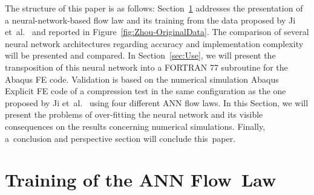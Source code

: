 \documentclass[algorithms,article,accept,pdftex,moreauthors]{Definitions/mdpi}
\begin{document}
The structure of this paper is as follows:
Section~\ref{sec:Training} addresses the presentation of a neural-network-based flow law and its training from the data proposed by Ji et~al.~\cite{Ji-2018} and reported in Figure~\ref{fig:Zhou-OriginalData}.
The comparison of several neural network architectures regarding accuracy and implementation complexity will be presented and compared.
In Section~\ref{sec:Use}, we will present the transposition of this neural network into a FORTRAN 77 subroutine for the Abaqus FE code.
Validation is based on the numerical simulation Abaqus Explicit FE code of a compression test in the same configuration as the one proposed by Ji et~al.~\cite{Ji-2018} using four different ANN flow laws.
In this Section, we will present the problems of over-fitting the neural network and its visible consequences on the results concerning numerical simulations.
Finally, a~conclusion and perspective section will conclude this~paper.

\section{Training of the ANN Flow~Law}\label{sec:Training}
\end{document}
